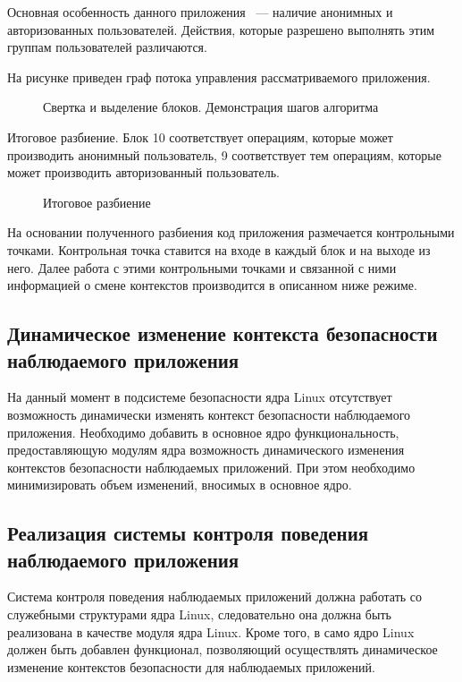 Основная особенность данного приложения ~--- наличие 
анонимных и авторизованных пользователей. Действия, 
которые разрешено выполнять этим группам пользователей
различаются. 

На рисунке приведен граф потока управления рассматриваемого 
приложения. 

\begin{figure}
  \scalebox{.35}{}
  \scalebox{.35}{}
\caption{Свертка и выделение блоков. Демонстрация шагов алгоритма}
\end{figure}


Итоговое разбиение. Блок 10 соответствует операциям, 
которые может производить анонимный пользователь, 
9 соответствует тем операциям, которые может производить 
авторизованный пользователь.

\begin{figure}
\centering
\scalebox{.80}{}
\caption{Итоговое разбиение} 
\end{figure}


На основании полученного разбиения код приложения размечается
контрольными точками. Контрольная точка ставится на входе 
в каждый блок и на выходе из него. Далее работа с этими 
контрольными точками и связанной с ними информацией о смене 
контекстов производится в описанном ниже режиме.

\subsection{Динамическое изменение контекста безопасности
                                    наблюдаемого приложения}

На данный момент в подсистеме безопасности ядра Linux отсутствует
возможность динамически изменять контекст безопасности наблюдаемого
приложения. Необходимо добавить в основное ядро функциональность,
предоставляющую модулям ядра возможность динамического изменения
контекстов безопасности наблюдаемых приложений. При этом необходимо
минимизировать объем изменений, вносимых в основное ядро.

\subsection{Реализация системы контроля поведения
		наблюдаемого приложения}

Система контроля поведения наблюдаемых приложений
должна работать со служебными структурами ядра
Linux, следовательно она должна быть реализована
в качестве модуля ядра Linux. Кроме того, в само
ядро Linux должен быть добавлен функционал, позволяющий
осуществлять динамическое изменение контекстов безопасности
для наблюдаемых приложений.

